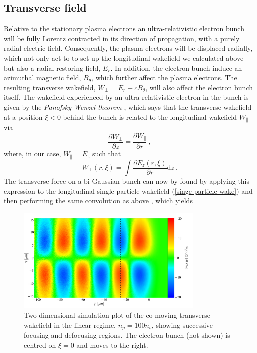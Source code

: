 \subsection{Transverse field} 
Relative to the stationary plasma electrons an ultra-relativistic electron bunch will be fully Lorentz contracted in its direction of propagation, with a purely radial electric field. Consequently, the plasma electrons will be displaced radially, which not only act to to set up the longitudinal wakefield we calculated above but also a radial restoring field, $E_r$.
In addition, the electron bunch induce an azimuthal magnetic field, $B_{\theta}$, which further affect the plasma electrons. The resulting transverse wakefield, $W_{\perp}=E_r-cB_{\theta}$, will also affect the electron bunch itself.  The wakefield experienced by an ultra-relativistic electron in the bunch is given by the \textit{Panofsky-Wenzel theorem} \cite{Vaganian1995}, which says that the transverse wakefield at a position $\xi<0$ behind the bunch is related to the longitudinal wakefield $W_{\parallel}$ via
\begin{equation}
\frac{\partial W_{\perp} }{\partial z}=\frac{\partial W_{\parallel} }{\partial r}~,
\end{equation} 
where, in our case, $W_{\parallel}=E_z$ such that
\begin{equation}
W_{\perp}(r,\xi)=\int \frac{\partial E_z(r,\xi) }{\partial r}\mathrm{d}z~.
\end{equation}
The transverse force on a bi-Gaussian bunch can now by found by applying this expression to the longitudinal single-particle wakefield (\ref{singe-particle-wake}) and then performing the same convolution as above \cite{Katsouleas1987, Mira2017}, which yields 
\begin{figure}
\centering
\includegraphics[width=0.8\textwidth]{transverse2d_final}
\caption{\small{Two-dimensional simulation plot of the co-moving transverse wakefield in the linear regime, $n_p=100n_b$, showing successive focusing and defocusing regions. The electron bunch (not shown) is centred on $\xi=0$ and moves to the right.}}
\label{transverse_plot}
\end{figure}
